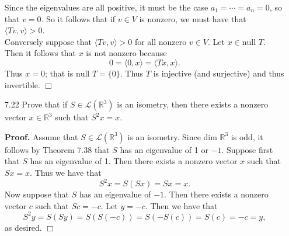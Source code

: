 \documentclass[9pt]{article}
\newcommand{\qed}{\hfill \ensuremath{\Box}}
\newcommand{\R}{\mathbb{R}}
\newcommand{\cyc}[1]{\langle #1 \rangle}
\begin{document}
\begin{enumerate}
      Since the eigenvalues are all positive, it must be the case
      $a_1 = \cdots = a_n = 0$, so that $v = 0$. So it follows that if $v \in V$
      is nonzero, we must have that $\cyc{Tv, v} > 0$. \\

      Conversely suppose that $\cyc{Tv, v} > 0$ for all nonzero $v \in V$. Let
      $x \in \text{null }T$. Then it follows that $x$ is not nonzero because
      $$0 = \cyc{0, x} = \cyc{Tx, x}.$$
      Thus $x = 0$; that is $\text{null }T = \{0\}$. Thus $T$ is injective
      (and surjective) and thus invertible. \qed      
   \item[7.22] Prove that if $S \in \mathcal{L}(\R^3)$ is an isometry, then
               there exists a nonzero vector $x \in \R^3$ such that $S^2x = x$.

      \textbf{Proof.} Assume that $S \in \mathcal{L}(\R^3)$ is an isometry.
      Since dim $\R^3$ is odd, it follows by Theorem 7.38 that $S$ has an
      eigenvalue of 1 or $-1$. Suppose first that $S$ has an eigenvalue of 1.
      Then there exists a nonzero vector $x$ such that $Sx = x$. Thus we have
      that
      $$S^2x = S(Sx) = Sx = x.$$
      Now suppose that $S$ has an eigenvalue of $-1$. Then there exists a
      nonzero vector $c$ such that $Sc = -c$. Let $y = -c$. Then we have that
      $$S^2y = S(Sy) = S(S(-c)) = S(-S(c)) = S(c) = -c = y,$$
      as desired. \qed
\end{enumerate}
\end{document}
